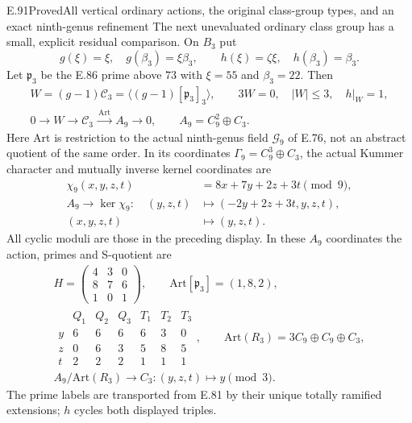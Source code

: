 \begin{statement}{E.91}{Proved}{All vertical ordinary actions, the original class-group types, and an exact ninth-genus refinement}
The next unevaluated ordinary class group has a small, explicit
residual comparison. On $B_3$ put
\[
 g(\xi)=\xi,\quad g(\beta_3)=\xi\beta_3,
 \qquad h(\xi)=\zeta\xi,\quad h(\beta_3)=\beta_3.
 \tag{E91.5}
\]
Let $\mathfrak p_3$ be the E.86 prime above $73$ with
$\xi=55$ and $\beta_3=22$. Then
\[
 \begin{gathered}
 W=(g-1)\mathcal C_3=\langle(g-1)[\mathfrak p_3]_3\rangle,
 \qquad 3W=0,\quad |W|\le3,\quad h|_W=1,\\
 0\longrightarrow W\longrightarrow\mathcal C_3
   \xrightarrow{\ \mathrm{Art}\ } A_9\longrightarrow0,
 \qquad A_9=C_9^2\oplus C_3 .
 \end{gathered}
 \tag{E91.6}
\]
Here $\mathrm{Art}$ is restriction to the actual ninth-genus
field $\mathcal G_9$ of E.76, not an abstract quotient of the
same order. In its coordinates
$\Gamma_9=C_9^3\oplus C_3$, the actual Kummer character and
mutually inverse kernel coordinates are
\[
 \begin{aligned}
 \chi_9(x,y,z,t)&=8x+7y+2z+3t\pmod9,\\
 A_9\longrightarrow\ker\chi_9:\quad
 (y,z,t)&\longmapsto(-2y+2z+3t,y,z,t),\\
 (x,y,z,t)&\longmapsto(y,z,t).
 \end{aligned}
 \tag{E91.7}
\]
All cyclic moduli are those in the preceding display. In these
$A_9$ coordinates the action, primes and S-quotient are
\[
 \begin{gathered}
 H=\begin{pmatrix}4&3&0\\8&7&6\\1&0&1\end{pmatrix},\qquad
 \mathrm{Art}[\mathfrak p_3]=(1,8,2),\\
 \begin{array}{c|ccc|ccc}
        &Q_1&Q_2&Q_3&T_1&T_2&T_3\\ \hline
 y&6&6&6&6&3&0\\
 z&0&6&3&5&8&5\\
 t&2&2&2&1&1&1
 \end{array},\qquad
 \mathrm{Art}(R_3)=3C_9\oplus C_9\oplus C_3,\\
 A_9/\mathrm{Art}(R_3)\longrightarrow C_3:
       (y,z,t)\longmapsto y\pmod3.
 \end{gathered}
 \tag{E91.8}
\]
The prime labels are transported from E.81 by their unique
totally ramified extensions; $h$ cycles both displayed triples.


\end{statement}

